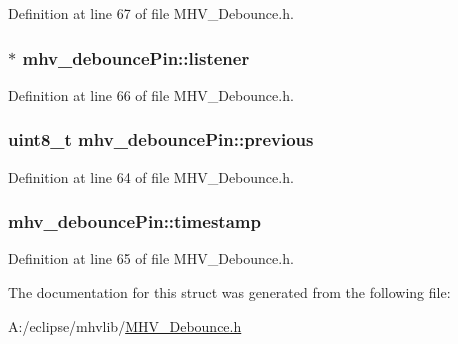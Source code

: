 Definition at line 67 of file M\-H\-V\-\_\-\-Debounce.\-h.

\hypertarget{structmhv__debounce_pin_aa7c133ca2e2edc8c1df591ef842432b9}{
\subsubsection[{listener}]{$\ast$ mhv\-\_\-debounce\-Pin\-::listener}}\label{structmhv__debounce_pin_aa7c133ca2e2edc8c1df591ef842432b9}


Definition at line 66 of file M\-H\-V\-\_\-\-Debounce.\-h.

\hypertarget{structmhv__debounce_pin_ac811cadb60a02f9b98876e62bb8df8fc}{
\subsubsection[{previous}]{\setlength{\rightskip}{0pt plus 5cm}uint8\-\_\-t mhv\-\_\-debounce\-Pin\-::previous}}\label{structmhv__debounce_pin_ac811cadb60a02f9b98876e62bb8df8fc}


Definition at line 64 of file M\-H\-V\-\_\-\-Debounce.\-h.

\hypertarget{structmhv__debounce_pin_a0d8a978d0e2cb1677e30b174986583f2}{
\subsubsection[{timestamp}]{ mhv\-\_\-debounce\-Pin\-::timestamp}}\label{structmhv__debounce_pin_a0d8a978d0e2cb1677e30b174986583f2}


Definition at line 65 of file M\-H\-V\-\_\-\-Debounce.\-h.



The documentation for this struct was generated from the following file\-:\begin{DoxyCompactItemize}
\item 
A\-:/eclipse/mhvlib/\hyperlink{_m_h_v___debounce_8h}{M\-H\-V\-\_\-\-Debounce.\-h}\end{DoxyCompactItemize}

